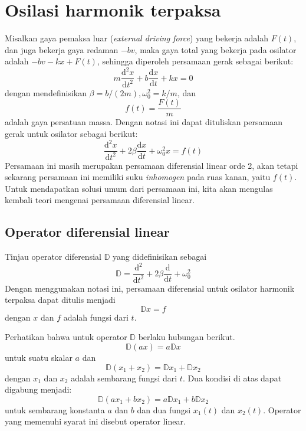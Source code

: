 \section{Osilasi harmonik terpaksa}

Misalkan gaya pemaksa luar (\textit{external driving force}) yang bekerja adalah
$F(t)$, dan juga bekerja gaya redaman $-bv$, maka gaya total yang
bekerja pada osilator adalah $-bv-kx+F(t)$, sehingga diperoleh persamaan
gerak sebagai berikut:
\begin{equation*}
m\frac{\mathrm{d}^{2}x}{\mathrm{d}t^{2}}+b\frac{\mathrm{d}x}{\mathrm{d}t}+kx=0
\end{equation*}
dengan mendefinisikan $\beta=b/(2m),$$\omega_{0}^{2}=k/m$, dan
\begin{equation*}
f(t)=\frac{F(t)}{m}
\end{equation*}
adalah gaya persatuan massa. Dengan notasi ini dapat dituliskan persamaan
gerak untuk osilator sebagai berikut:
\begin{equation}
\frac{\mathrm{d}^{2}x}{\mathrm{d}t^{2}} + 2\beta\frac{\mathrm{d}x}{\mathrm{d}t} + \omega_{0}^{2}x=f(t)
\end{equation}
Persamaan ini masih merupakan persamaan diferensial linear orde 2, akan tetapi sekarang persamaan
ini memiliki suku \textit{inhomogen} pada ruas kanan, yaitu $f(t)$. Untuk mendapatkan
solusi umum dari persamaan ini, kita akan mengulas kembali teori mengenai persamaan
diferensial linear.

\subsection{Operator diferensial linear}

Tinjau operator diferensial $\mathbb{D}$ yang didefinisikan sebagai
\begin{equation}
\mathbb{D}=\frac{\mathrm{d}^{2}}{\mathrm{d}t^{2}}+2\beta\frac{\mathrm{d}}{\mathrm{d}t}+\omega_{0}^{2}
\end{equation}
Dengan menggunakan notasi ini, persamaan diferensial untuk osilator
harmonik terpaksa dapat ditulis menjadi
\begin{equation*}
\mathbb{D}x=f
\end{equation*}
dengan $x$ dan $f$ adalah fungsi dari $t$.

Perhatikan bahwa untuk operator $\mathbb{D}$
berlaku hubungan berikut.
\begin{equation*}
\mathbb{D}(ax) = a\mathbb{D}x
\end{equation*}
untuk suatu skalar $a$ dan
\begin{equation*}
\mathbb{D}(x_{1} + x_{2}) = \mathbb{D}x_{1} + \mathbb{D}x_{2}
\end{equation*}
dengan $x_{1}$ dan $x_{2}$ adalah sembarang fungsi dari $t$.
Dua kondisi di atas dapat digabung menjadi:
\begin{equation*}
\mathbb{D}(ax_{1} + bx_{2})=a\mathbb{D}x_{1}+b\mathbb{D}x_{2}
\end{equation*}
untuk sembarang konstanta $a$ dan $b$ dan dua fungsi $x_{1}(t)$
dan $x_{2}(t)$. Operator yang memenuhi syarat ini disebut
operator linear.

